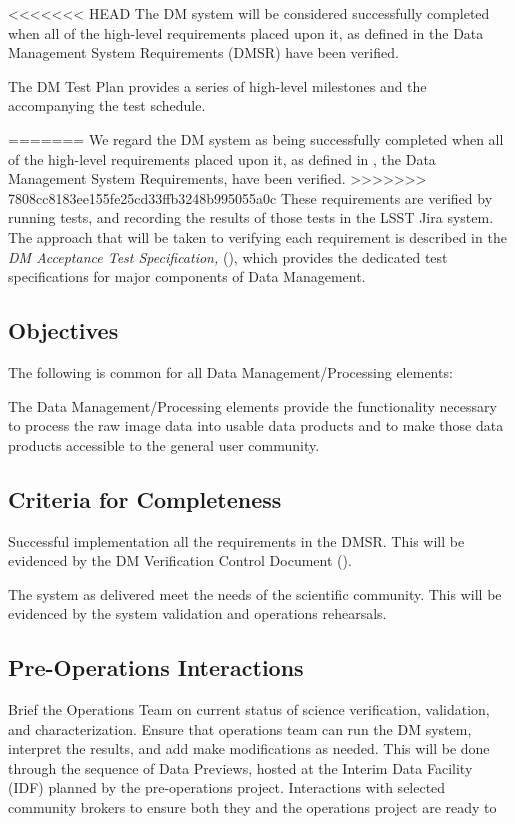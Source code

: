 <<<<<<< HEAD
The DM system will be considered successfully completed when all of the high-level requirements placed upon it, as defined in  the Data Management System Requirements (DMSR) have been verified. 

The DM Test Plan provides a series of high-level milestones and the accompanying the test schedule. 

=======
We regard the DM system as being successfully completed when all of the high-level requirements placed upon it, as defined in , the Data Management System Requirements,  have been verified. 
>>>>>>> 7808cc8183ee155fe25cd33ffb3248b995055a0c
These requirements are verified by running tests, and recording the results of those tests in the LSST Jira system. 
The approach that will be taken to verifying each requirement is described in the {\it DM Acceptance Test Specification,} (), which provides the dedicated test specifications for major components of Data Management.



\subsection{Objectives}
The following is common for all Data Management/Processing elements:

The Data Management/Processing elements provide the functionality necessary to process the raw image data into usable data products and to make those data products accessible to the general user community.

\subsection{Criteria for Completeness} 
Successful implementation all the requirements in the DMSR. 
This will be evidenced by the DM Verification Control Document ().

The system as delivered meet the needs of the scientific community. 
This will be evidenced by the system validation and operations rehearsals. 

\subsection{Pre-Operations Interactions}

Brief the Operations Team on current status of science verification, validation, and characterization.
Ensure that operations team can run the DM system, interpret the results, and add make modifications as needed. 
This will be done through the sequence of Data Previews,  hosted at the Interim Data Facility (IDF) planned by the pre-operations project. 
Interactions with selected community brokers to ensure both they and the operations project are ready to 

